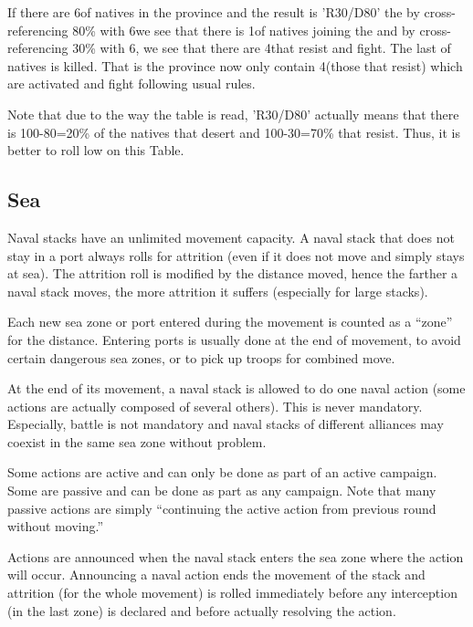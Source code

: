 \begin{exemple}
  If there are 6\LD of natives in the province and the result is 'R30/D80' the
  by cross-referencing 80\% with 6\LD we see that there is 1\LD of natives
  joining the \LeaderC and by cross-referencing 30\% with 6\LD, we see that
  there are 4\LD that resist and fight. The last \LD of natives is
  killed. That is the province now only contain 4\LD (those that resist) which
  are activated and fight following usual rules.

  Note that due to the way the table is read, 'R30/D80' actually means that
  there is 100-80=20\% of the natives that desert and 100-30=70\% that
  resist. Thus, it is better to roll low on this Table.
\end{exemple}

\subsection{Sea}
Naval stacks have an unlimited movement capacity. A naval stack that does not
stay in a port always rolls for attrition (even if it does not move and simply
stays at sea). The attrition roll is modified by the distance moved, hence the
farther a naval stack moves, the more attrition it suffers (especially for
large stacks).

Each new sea zone or port entered during the movement is counted as a ``zone''
for the distance. Entering ports is usually done at the end of movement, to
avoid certain dangerous sea zones, or to pick up troops for combined move.

At the end of its movement, a naval stack is allowed to do one naval action
(some actions are actually composed of several others). This is never
mandatory. Especially, battle is not mandatory and naval stacks of different
alliances may coexist in the same sea zone without problem.

Some actions are active and can only be done as part of an active
campaign. Some are passive and can be done as part as any campaign. Note that
many passive actions are simply ``continuing the active action from previous
round without moving.''

Actions are announced when the naval stack enters the sea zone where the
action will occur. Announcing a naval action ends the movement of the stack
and attrition (for the whole movement) is rolled immediately before any
interception (in the last zone) is declared and before actually resolving the
action.

